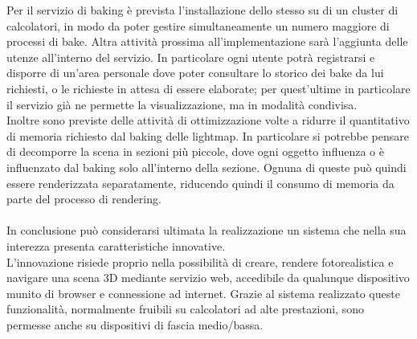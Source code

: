 Per il servizio di baking è prevista l’installazione dello stesso su di un cluster di calcolatori, in modo da poter gestire simultaneamente un numero maggiore di processi di bake. 
Altra attività prossima all’implementazione sarà l’aggiunta delle utenze all’interno del servizio. In particolare ogni utente potrà registrarsi e disporre di un’area personale dove poter consultare lo storico dei bake da lui richiesti, o le richieste in attesa di essere elaborate; per quest’ultime in particolare il servizio già ne permette la visualizzazione, ma in modalità condivisa.
\\ 
Inoltre sono previste delle attività di ottimizzazione volte a ridurre il quantitativo di memoria richiesto dal baking delle lightmap. In particolare si potrebbe pensare di decomporre la scena in sezioni più piccole, dove ogni oggetto influenza o è influenzato dal baking solo all’interno della sezione. Ognuna di queste può quindi essere renderizzata separatamente, riducendo quindi il consumo di memoria da parte del processo di rendering.
\\
\\
In conclusione può considerarsi ultimata la realizzazione un sistema che nella sua interezza presenta caratteristiche innovative.
\\
L’innovazione risiede proprio nella possibilità di creare, rendere fotorealistica e navigare una scena 3D mediante servizio web, accedibile da qualunque dispositivo munito di browser e connessione ad internet. Grazie al sistema realizzato queste funzionalità, normalmente fruibili su calcolatori ad alte prestazioni, sono permesse anche su dispositivi di fascia medio/bassa.